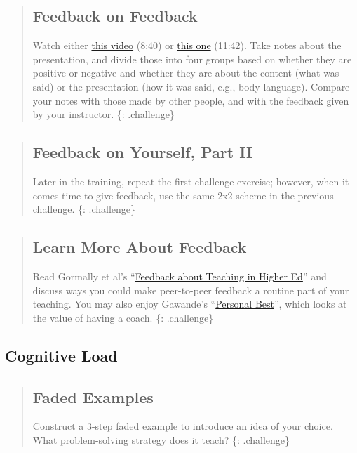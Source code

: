 \begin{quote}
\subsection{Feedback on Feedback}\label{feedback-on-feedback}

Watch either \href{https://vimeo.com/139316669}{this video} (8:40) or
\href{https://vimeo.com/139181120}{this one} (11:42). Take notes about
the presentation, and divide those into four groups based on whether
they are positive or negative and whether they are about the content
(what was said) or the presentation (how it was said, e.g., body
language). Compare your notes with those made by other people, and with
the feedback given by your instructor. \{: .challenge\}
\end{quote}

\begin{quote}
\subsection{Feedback on Yourself, Part
II}\label{feedback-on-yourself-part-ii}

Later in the training, repeat the first challenge exercise; however,
when it comes time to give feedback, use the same 2x2 scheme in the
previous challenge. \{: .challenge\}
\end{quote}

\begin{quote}
\subsection{Learn More About Feedback}\label{learn-more-about-feedback}

Read Gormally et al's
``\href{\{\{\%20page.root\%20\}\}/files/papers/gormally-teaching-feedback-2014.pdf}{Feedback
about Teaching in Higher Ed}'' and discuss ways you could make
peer-to-peer feedback a routine part of your teaching. You may also
enjoy Gawande's
``\href{http://www.newyorker.com/magazine/2011/10/03/personal-best}{Personal
Best}'', which looks at the value of having a coach. \{: .challenge\}
\end{quote}

\subsection{Cognitive Load}\label{cognitive-load}

\begin{quote}
\subsection{Faded Examples}\label{faded-examples}

Construct a 3-step faded example to introduce an idea of your choice.
What problem-solving strategy does it teach? \{: .challenge\}
\end{quote}

